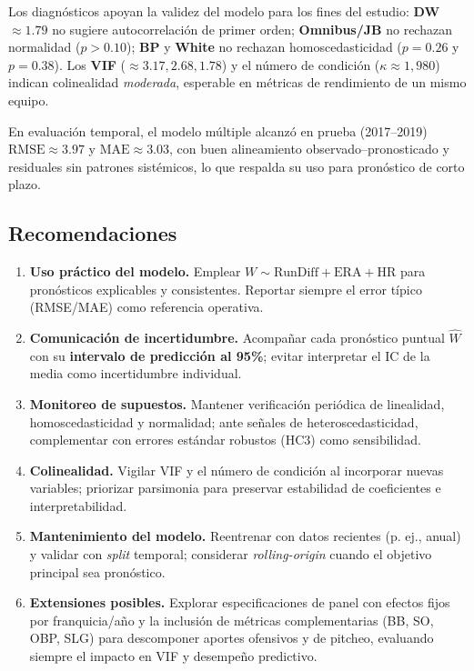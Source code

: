 \documentclass[man,floatsintext]{apa7}
\begin{document}
Los diagnósticos apoyan la validez del modelo para los fines del estudio: \textbf{DW}\(\approx1.79\) no sugiere autocorrelación de primer orden; \textbf{Omnibus/JB} no rechazan normalidad (\(p>0.10\)); \textbf{BP} y \textbf{White} no rechazan homoscedasticidad (\(p=0.26\) y \(p=0.38\)). Los \textbf{VIF} (\(\approx3.17, 2.68, 1.78\)) y el número de condición (\(\kappa\approx1{,}980\)) indican colinealidad \emph{moderada}, esperable en métricas de rendimiento de un mismo equipo.

En evaluación temporal, el modelo múltiple alcanzó en prueba (2017--2019) \(\text{RMSE}\approx3.97\) y \(\text{MAE}\approx3.03\), con buen alineamiento observado–pronosticado y residuales sin patrones sistémicos, lo que respalda su uso para pronóstico de corto plazo.

\subsection{Recomendaciones}
\begin{enumerate}
    \item \textbf{Uso práctico del modelo.} Emplear \(W \sim \text{RunDiff} + \text{ERA} + \text{HR}\) para pronósticos explicables y consistentes. Reportar siempre el error típico (RMSE/MAE) como referencia operativa.
    \item \textbf{Comunicación de incertidumbre.} Acompañar cada pronóstico puntual \(\hat W\) con su \textbf{intervalo de predicción al 95\%}; evitar interpretar el IC de la media como incertidumbre individual.
    \item \textbf{Monitoreo de supuestos.} Mantener verificación periódica de linealidad, homoscedasticidad y normalidad; ante señales de heteroscedasticidad, complementar con errores estándar robustos (HC3) como sensibilidad.
    \item \textbf{Colinealidad.} Vigilar VIF y el número de condición al incorporar nuevas variables; priorizar parsimonia para preservar estabilidad de coeficientes e interpretabilidad.
    \item \textbf{Mantenimiento del modelo.} Reentrenar con datos recientes (p. ej., anual) y validar con \emph{split} temporal; considerar \emph{rolling-origin} cuando el objetivo principal sea pronóstico.
    \item \textbf{Extensiones posibles.} Explorar especificaciones de panel con efectos fijos por franquicia/año y la inclusión de métricas complementarias (BB, SO, OBP, SLG) para descomponer aportes ofensivos y de pitcheo, evaluando siempre el impacto en VIF y desempeño predictivo.
\end{enumerate}
\end{document}
